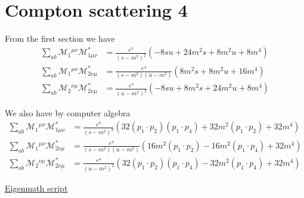 

\section*{Compton scattering 4}

From the first section we have
\begin{align*}
\sum_{ab}\mathcal M_{1}{}^{\mu\nu}\mathcal M^*_{1\mu\nu}
&=\frac{e^4}{(s-m^2)^2}
\left(
-8 s u + 24 m^2 s + 8 m^2 u + 8 m^4
\right)
\\
\sum_{ab}\mathcal M_{1}{}^{\mu\nu}\mathcal M^*_{2\nu\mu}
&=\frac{e^4}{(s-m^2)(u-m^2)}
\left(
8 m^2 s + 8 m^2 u + 16 m^4
\right)
\\
\sum_{ab}\mathcal M_{2}{}^{\nu\mu}\mathcal M^*_{2\nu\mu}
&=\frac{e^4}{(u-m^2)^2}
\left(
-8 s u + 8 m^2 s + 24 m^2 u + 8 m^4
\right)
\end{align*}

We also have by computer algebra
\begin{align*}
\sum_{ab}\mathcal M_{1}{}^{\mu\nu}\mathcal M^*_{1\mu\nu}
&=\frac{e^4}{(s-m^2)^2}
\left(
32 (p_1\cdot p_2) (p_1\cdot p_4) + 32 m^2 (p_1\cdot p_2) + 32 m^4
\right)
\\
\sum_{ab}\mathcal M_{1}{}^{\mu\nu}\mathcal M^*_{2\nu\mu}
&=\frac{e^4}{(s-m^2)(u-m^2)}
\left(
16 m^2 (p_1\cdot p_2) - 16 m^2 (p_1\cdot p_4) + 32 m^4
\right)
\\
\sum_{ab}\mathcal M_{2}{}^{\nu\mu}\mathcal M^*_{2\nu\mu}
&=\frac{e^4}{(u-m^2)^2}
\left(
32 (p_1\cdot p_2) (p_1\cdot p_4) - 32 m^2 (p_1\cdot p_4) + 32 m^4
\right)
\end{align*}

\href{https://georgeweigt.github.io/examples/compton-scattering-4-demo.html}{Eigenmath script}



